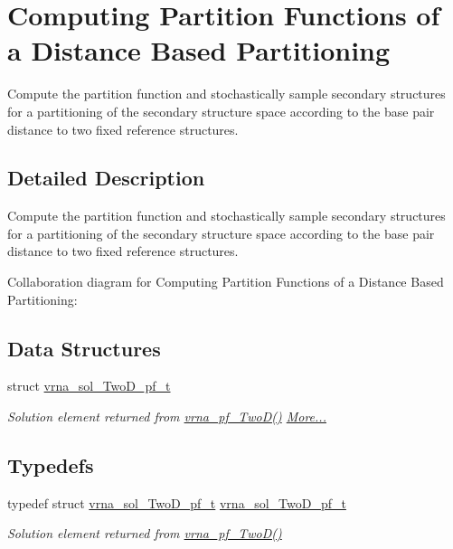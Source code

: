 \hypertarget{group__kl__neighborhood__pf}{}\section{Computing Partition Functions of a Distance Based Partitioning}
\label{group__kl__neighborhood__pf}


Compute the partition function and stochastically sample secondary structures for a partitioning of the secondary structure space according to the base pair distance to two fixed reference structures.  




\subsection{Detailed Description}
Compute the partition function and stochastically sample secondary structures for a partitioning of the secondary structure space according to the base pair distance to two fixed reference structures. 

Collaboration diagram for Computing Partition Functions of a Distance Based Partitioning\+:
\subsection*{Data Structures}
\begin{DoxyCompactItemize}
\item 
struct \mbox{\hyperlink{group__kl__neighborhood__pf_structvrna__sol__TwoD__pf__t}{vrna\+\_\+sol\+\_\+\+Two\+D\+\_\+pf\+\_\+t}}
\begin{DoxyCompactList}\small\item\em Solution element returned from \mbox{\hyperlink{group__kl__neighborhood__pf_ga0bc3427689bd09da09b8b3094a27f836}{vrna\+\_\+pf\+\_\+\+Two\+D()}}  \mbox{\hyperlink{group__kl__neighborhood__pf_structvrna__sol__TwoD__pf__t}{More...}}\end{DoxyCompactList}\end{DoxyCompactItemize}
\subsection*{Typedefs}
\begin{DoxyCompactItemize}
\item 
typedef struct \mbox{\hyperlink{group__kl__neighborhood__pf_structvrna__sol__TwoD__pf__t}{vrna\+\_\+sol\+\_\+\+Two\+D\+\_\+pf\+\_\+t}} \mbox{\hyperlink{group__kl__neighborhood__pf_ga5e449fbd695406aabd2bcabddc374621}{vrna\+\_\+sol\+\_\+\+Two\+D\+\_\+pf\+\_\+t}}
\begin{DoxyCompactList}\small\item\em Solution element returned from \mbox{\hyperlink{group__kl__neighborhood__pf_ga0bc3427689bd09da09b8b3094a27f836}{vrna\+\_\+pf\+\_\+\+Two\+D()}} \end{DoxyCompactList}\end{DoxyCompactItemize}

